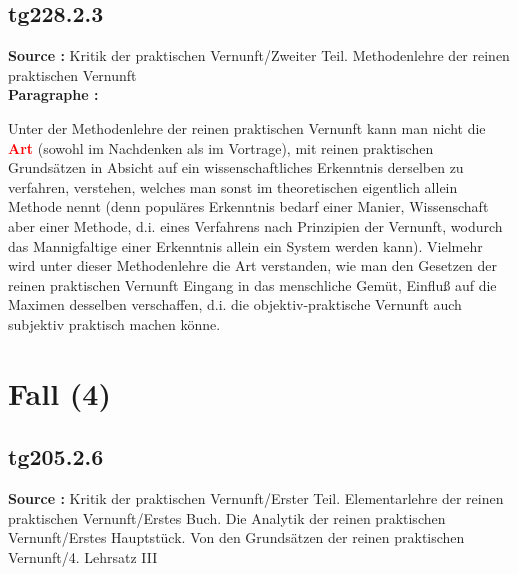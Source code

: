\documentclass[a4paper,12pt,twoside]{book}
\newcommand{\match}[1]{\textcolor{red}{\textbf{#1}}}
\newcommand{\unnumberedsection}[1]{
	\section*{#1}
	\addcontentsline{toc}{section}{#1}
	\markright{#1}
}
\begin{document}
	\subsection*{tg228.2.3} 
	\textbf{Source : }Kritik der praktischen Vernunft/Zweiter Teil. Methodenlehre der reinen praktischen Vernunft\\  
	
	\noindent\textbf{Paragraphe : }
	
	Unter der Methodenlehre der reinen praktischen Vernunft kann man nicht die \match{Art} (sowohl im Nachdenken als im Vortrage), mit reinen praktischen Grundsätzen in Absicht auf ein wissenschaftliches Erkenntnis derselben zu verfahren, verstehen, welches man sonst im theoretischen eigentlich allein Methode nennt (denn populäres Erkenntnis bedarf einer Manier, Wissenschaft aber einer Methode, d.i. eines Verfahrens nach Prinzipien der Vernunft, wodurch das Mannigfaltige einer Erkenntnis allein ein System werden kann). Vielmehr wird unter dieser Methodenlehre die Art verstanden, wie man den Gesetzen der reinen praktischen Vernunft Eingang in das menschliche Gemüt, Einfluß auf die Maximen desselben verschaffen, d.i. die objektiv-praktische Vernunft auch subjektiv praktisch machen könne. 
	
	\unnumberedsection{Fall (4)} 
	\subsection*{tg205.2.6} 
	\textbf{Source : }Kritik der praktischen Vernunft/Erster Teil. Elementarlehre der reinen praktischen Vernunft/Erstes Buch. Die Analytik der reinen praktischen Vernunft/Erstes Hauptstück. Von den Grundsätzen der reinen praktischen Vernunft/4. Lehrsatz III\\  
	
\end{document}
